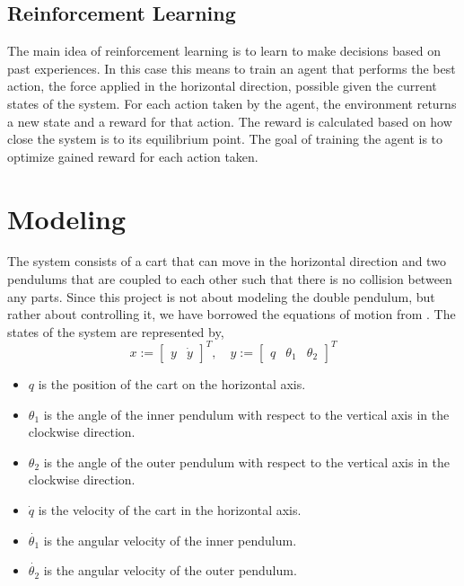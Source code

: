 \documentclass{LTHtwocol} %
\begin{document}
\subsection{Reinforcement Learning}
The main idea of reinforcement learning is to learn to make decisions based on past experiences.
In this case this means to train an agent that performs the best action, the force applied in the horizontal direction,  possible given the current states of the system.
For each action taken by the agent, the environment returns a new state and a reward for that action.
The reward is calculated based on how close the system is to its equilibrium point.
The goal of training the agent is to optimize gained reward for each action taken.

\section{Modeling}
The system consists of a cart that can move in the horizontal direction and two pendulums that are coupled to each other such that there is no collision between any parts.
Since this project is not about modeling the double pendulum, but rather about controlling it, we have borrowed the equations of motion from \cite{Double_Pendulum_Equations}.
The states of the system are represented by,
\begin{equation}
x  :=
\begin{bmatrix}
y & \dot{y}
\end{bmatrix}
^T , \quad y :=
\begin{bmatrix}
q & \theta_1 & \theta_2
\end{bmatrix}
^T
\end{equation}
\begin{itemize}
\item $q$ is the position of the cart on the horizontal axis.
\item $\theta_1$ is the angle of the inner pendulum with respect to the vertical axis in the clockwise direction.
\item $\theta_2$ is the angle of the outer pendulum with respect to the vertical axis in the clockwise direction.
\item $\dot{q}$ is the velocity of the cart in the horizontal axis.
\item $\dot{\theta_1}$ is the angular velocity of the inner pendulum.
\item $\dot{\theta_2}$ is the angular velocity of the outer pendulum.
\end{itemize}
\end{document}
